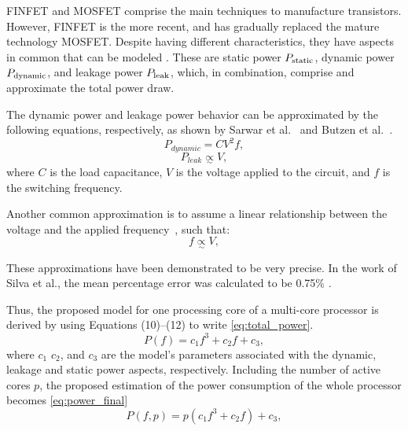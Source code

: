FINFET and MOSFET comprise the main techniques to manufacture transistors. However, FINFET is the more recent,  and has gradually replaced the mature technology MOSFET. Despite having different characteristics, they have aspects in common that can be modeled  \cite{Rauber2014EnergyScaling, Goel2016AProcessors, Du2017ModelingSystems, Gonzalez1997SupplyCMOS}. These are static power $P_{\rm static}$, dynamic power $P_{\rm dynamic}$, and leakage power $P_{\rm leak}$, which, in combination, comprise  and approximate the total power draw.

The dynamic power and leakage power behavior can be approximated by the following equations, respectively, as shown by Sarwar et al.~\cite{Sarwar1997CmosCalculation} and Butzen et al.~\cite{Butzen2007LeakageGates}.
\begin{equation}
	P_{dynamic}=CV^2f,
	\label{eq:power_dyn}
\end{equation}
\begin{equation}
	P_{leak} \underset{\sim}{\propto} V,
	\label{eq:power_leak}
\end{equation}
where $C$ is the load capacitance, $V$ is the voltage applied to the circuit, and $f$ is the switching frequency.

Another common approximation is to assume a linear relationship between the voltage and the applied frequency~\cite{Usman2013ANoC}, such that:
\begin{equation}
	f \underset{\sim}{\propto} V,
	\label{eq:f_v}
\end{equation}

These approximations have been demonstrated to be very precise. In the work of Silva et al., the mean percentage error was calculated to be 0.75\% \cite{Silva2019Energy-OptimalApplications}.

Thus, the proposed model for one processing core of a multi-core processor is derived by using Equations (10)--(12) to write \cref{eq:total_power}.
\begin{equation}
	P(f)= c_1f^3+c_2f+c_3,
	\label{eq:total_power}
\end{equation}
where $c_1$ $c_2$, and $c_3$ are the model's parameters associated with the dynamic, leakage and static power aspects, respectively. Including the number of active cores $p$, the proposed estimation of the power consumption of the whole processor becomes \cref{eq:power_final}
\begin{equation}
	P(f,p)= p(c_1f^3+c_2f)+c_3,
	\label{eq:power_final}
\end{equation}

